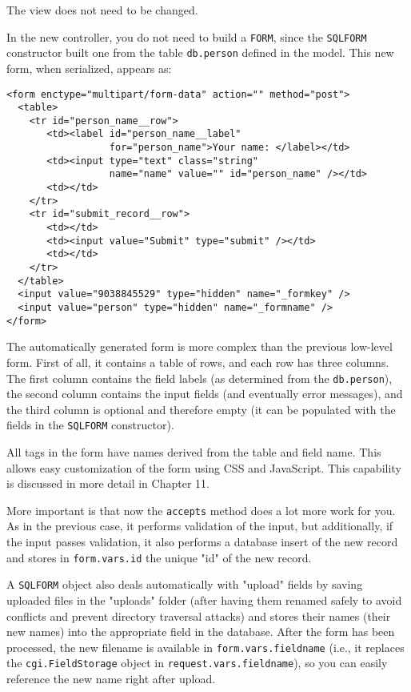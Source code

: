 \documentclass[justified,sixbynine,notoc]{tufte-book}
\def\ft{\small\tt}
\begin{document}
\begin{fullwidth}
The view does not need to be changed.

In the new controller, you do not need to build a {\ft FORM}, since the {\ft SQLFORM} constructor built one from the table {\ft db.person} defined in the model. This new form, when serialized, appears as:
\begin{lstlisting}[keywords={}]
<form enctype="multipart/form-data" action="" method="post">
  <table>
    <tr id="person_name__row">
       <td><label id="person_name__label"
                  for="person_name">Your name: </label></td>
       <td><input type="text" class="string"
                  name="name" value="" id="person_name" /></td>
       <td></td>
    </tr>
    <tr id="submit_record__row">
       <td></td>
       <td><input value="Submit" type="submit" /></td>
       <td></td>
    </tr>
  </table>
  <input value="9038845529" type="hidden" name="_formkey" />
  <input value="person" type="hidden" name="_formname" />
</form>
\end{lstlisting}

The automatically generated form is more complex than the previous low-level form. First of all, it contains a table of rows, and each row has three columns. The first column contains the field labels (as determined from the {\ft db.person}), the second column contains the input fields (and eventually error messages), and the third column is optional and therefore empty (it can be populated with the fields in the {\ft SQLFORM} constructor).

All tags in the form have names derived from the table and field name. This allows easy customization of the form using CSS and JavaScript. This capability is discussed in more detail in Chapter 11.

More important is that now the {\ft accepts} method does a lot more work for you. As in the previous case, it performs validation of the input, but additionally, if the input passes validation, it also performs a database insert of the new record and stores in {\ft form.vars.id} the unique "id" of the new record.

A {\ft SQLFORM} object also deals automatically with "upload" fields by saving uploaded files in the "uploads" folder (after having them renamed safely to avoid conflicts and prevent directory traversal attacks) and stores their names (their new names) into the appropriate field in the database. After the form has been processed, the new filename is available in {\ft form.vars.fieldname} (i.e., it replaces the {\ft cgi.FieldStorage} object in {\ft request.vars.fieldname}), so you can easily reference the new name right after upload.


\end{fullwidth}
\end{document}
